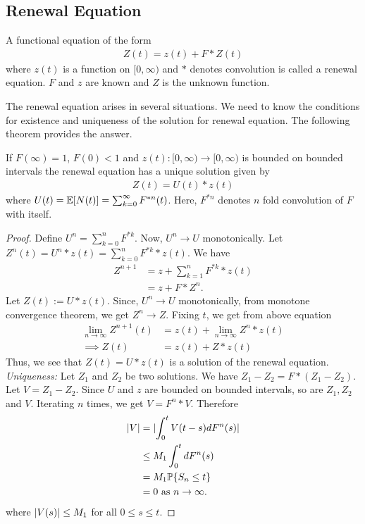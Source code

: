 \documentclass[all-lectures.tex]{subfiles}
\begin{document}
\subsection{Renewal Equation}
\begin{defn} A functional equation of the form 
\begin{align*}
Z(t) = z(t) + F*Z(t)
\end{align*}
where $z(t)$ is a function on $[0,\infty)$ and $*$ denotes convolution is called a renewal equation. $F$ and $z$ are known and $Z$ is the unknown function.
\end{defn}
The renewal equation arises in several situations. We need to know the conditions for existence and uniqueness of the solution for renewal equation. The following theorem provides the answer.
\begin{prop}
If $F(\infty) = 1$, $F(0) < 1$ and $z(t):[0,\infty) \rightarrow [0,\infty)$ is bounded on bounded intervals the renewal equation has a unique solution given by 
\begin{align*}
Z(t) = U(t) * z(t)
\end{align*}
where $U(t) = \mathbb{E}[N(t)] = \sum_{k=0}^\infty F^{*n}(t)$. Here, $F^{*n}$ denotes $n$ fold convolution of $F$ with itself.
\begin{proof}
Define $U^n = \sum_{k=0}^n F^{*k}$. Now, $U^n \to U$ monotonically. Let $Z^n(t) = U^n*z(t) = \sum_{k=0}^n F^{*k}*z(t)$. We have
\begin{align*}
Z^{n+1} &= z + \sum_{k=1}^n F^{*k}*z(t) \\
&= z + F * Z^n.
\end{align*}
Let  $Z(t) :=  U* z(t)$. Since, $U^n \to U$ monotonically, from monotone convergence theorem, we get $Z^n \to Z$. Fixing $t$, we get from above equation 
\begin{align*}
\lim_{n \to \infty} Z^{n+1}(t) &= z(t) + \lim_{n\to \infty} Z^n*z(t)\\
\implies Z(t) &= z(t) + Z*z(t)
\end{align*}
Thus, we see that $Z(t) = U*z(t)$ is a solution of the renewal equation.\\
\indent \textit{Uniqueness:} Let $Z_1$ and $Z_2$ be two solutions. We have $Z_1-Z_2 = F * (Z_1 - Z_2)$. Let $V = Z_1 - Z_2$. Since $U$ and $z$ are bounded on bounded intervals, so are $Z_1,Z_2$ and $V$. Iterating $n$ times, we get $V = F^n*V$. Therefore
\begin{align*}
\lvert V\rvert &= \lvert \int_0^t V(t-s) d F^n(s) \rvert \\
&\leq M_1 \int_0^t d F^n(s) \\
&= M_1 \mathbb{P}\{S_n \leq t\} \\
&= 0 \text{ as }n \to \infty.
\end{align*}
where $\lvert V(s)\rvert \leq M_1$ for all $0\leq s \leq t$.

\end{proof}
\end{prop}
\end{document}
